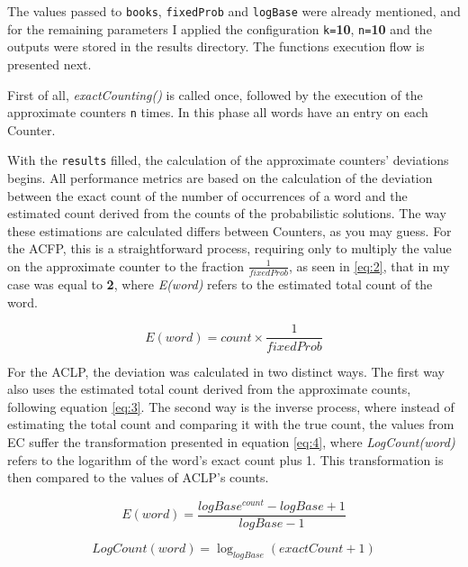 \documentclass[shortpaper]{revdetua}
\begin{document}
The values passed to \texttt{books}, \texttt{fixedProb} and \texttt{logBase} 
were already mentioned, and for the remaining parameters I applied the 
configuration \texttt{k=}\textbf{10}, \texttt{n=}\textbf{10} and the outputs were stored in 
the results directory.
The functions execution flow is presented next.

First of all, \textit{exactCounting()} is called once, followed by the execution
of the approximate counters \texttt{n} times.
In this phase all words have an entry on each Counter.

With the \texttt{results} filled, the calculation of the approximate counters'
deviations begins.
All performance metrics are based on the calculation of the deviation between 
the exact count of the number of occurrences of a word and the estimated count 
derived from the counts of the probabilistic solutions.
The way these estimations are calculated differs between Counters, as you may guess.
For the ACFP, this is a straightforward process, requiring only to multiply the 
value on the approximate counter to the fraction $ \frac{1}{fixedProb}$, as seen 
in \ref{eq:2}, that in my case was equal to \textbf{2}, where \textit{E(word)}
refers to the estimated total count of the word.

{
    \begin{equation} \label{eq:2}
        E(word) = count \times \frac{1}{fixedProb}
    \end{equation}
}

For the ACLP, the deviation was calculated in two distinct ways.
The first way also uses the estimated total count derived from the approximate
counts, following equation \ref{eq:3}.
The second way is the inverse process, where instead of estimating the total count
and comparing it with the true count, the values from EC suffer the transformation
presented in equation \ref{eq:4}, where \textit{LogCount(word)} refers to the 
logarithm of the word's exact count plus 1. This transformation is then compared 
to the values of ACLP's counts.

\begin{equation} \label{eq:3}
    E(word) = \frac{logBase^{count} - logBase + 1}{logBase - 1}
\end{equation}

{
    \begin{equation} \label{eq:4}
        LogCount(word) = \log_{logBase}{(exactCount+1)}
    \end{equation}
}
\end{document}
